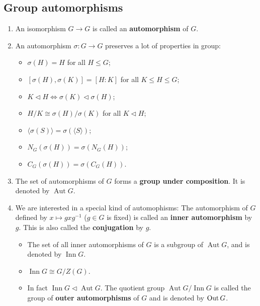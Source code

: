 \subsection*{Group automorphisms}
\begin{enumerate}[(1)]
	\item An isomorphism $G\rightarrow G$ is called an \textbf{automorphism} of $G$.
	\item An automorphism $\sigma: G\rightarrow G$ preserves a lot of properties in group:
	\begin{itemize}
		\item $\sigma(H) = H$ for all $H\leq G$;
		\item $[\sigma(H),\sigma(K)] = [H:K]$ for all $K\leq H\leq G$;
		\item $K\lhd H\Leftrightarrow \sigma(K)\lhd \sigma(H)$;
		\item $H/K \cong \sigma(H)/\sigma(K)$ for all $K\lhd H$;
		\item $\langle \sigma(S)\rangle =\sigma(\langle S\rangle)$;
		\item $N_G(\sigma(H)) = \sigma(N_G(H))$;
		\item $C_G(\sigma(H)) = \sigma(C_G(H))$.
	\end{itemize}
	\item The set of automorphisms of $G$ forms a \textbf{group under composition}. It is denoted by $\operatorname{Aut}G$.
	\item We are interested in a special kind of automophisms: The automorphism of $G$ defined by $x\mapsto gxg^{-1}$ ($g\in G$ is fixed) is called an \textbf{inner automorphism} by $g$. This is also called the \textbf{conjugation} by $g$. 
	\begin{itemize}
		\item The set of all inner automorphisms of $G$ is a subgroup of $\operatorname{Aut}G$, and is denoted by $\operatorname{Inn} G$. 
		\item $\operatorname{Inn} G \cong G/Z(G)$.
		\item In fact $\operatorname{Inn} G\lhd \operatorname{Aut}G$. The quotient group   $\operatorname{Aut}G / \operatorname{Inn} G$ is called the group of \textbf{outer automorphisms} of $G$ and is denoted by $\operatorname{Out} G$.
	\end{itemize}


\end{enumerate}
